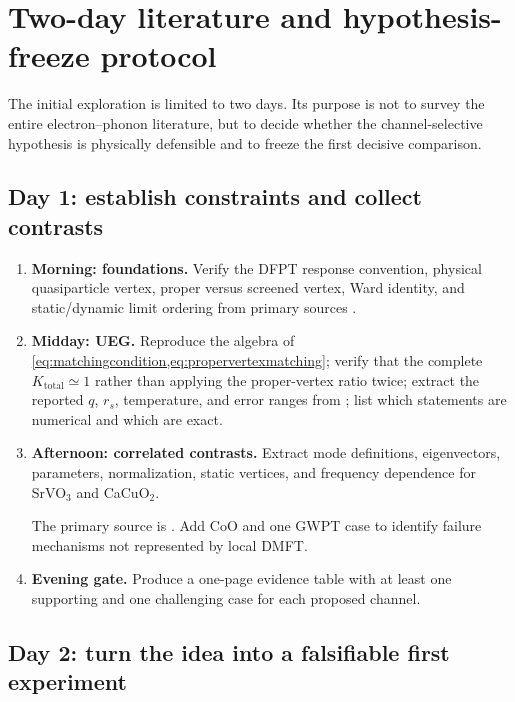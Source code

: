 \section{Two-day literature and hypothesis-freeze protocol}
\label{app:twoday}

The initial exploration is limited to two days.  Its purpose is not to survey the
entire electron--phonon literature, but to decide whether the channel-selective
hypothesis is physically defensible and to freeze the first decisive comparison.

\subsection*{Day 1: establish constraints and collect contrasts}

\begin{enumerate}
  \item \textbf{Morning: foundations.}  Verify the DFPT response convention,
  physical quasiparticle vertex, proper versus screened vertex, Ward identity, and
  static/dynamic limit ordering from primary sources
  \citep{Baroni2001,Giustino2017,Hedin1965,Nambu1960}.
  \item \textbf{Midday: UEG.}  Reproduce the algebra of
  \cref{eq:matchingcondition,eq:propervertexmatching}; verify that the complete
  $K_{\mathrm{total}}\simeq1$ rather than applying the proper-vertex ratio twice;
  extract the reported $q$, $r_s$, temperature, and
  error ranges from \citet{Cai2025}; list which statements are numerical and which
  are exact.
  \item \textbf{Afternoon: correlated contrasts.}  Extract mode definitions,
  eigenvectors, parameters, normalization, static vertices, and frequency
  dependence for SrVO$_3$ and CaCuO$_2$.

  The primary source is \citet{Abramovitch2025}.  Add CoO and one GWPT case to
  identify failure mechanisms not represented by local DMFT.
  \item \textbf{Evening gate.}  Produce a one-page evidence table with at least
  one supporting and one challenging case for each proposed channel.
\end{enumerate}

\subsection*{Day 2: turn the idea into a falsifiable first experiment}

